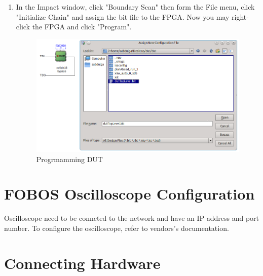 \begin{enumerate}
\begin{figure}[H]
\begin{center}
		\caption{\label{fig:dut-run-impact}}
		\end{center}
		\vspace{-3ex}
		\end{figure}
  \item In the Impact window, click "Boundary Scan" then form the File menu, click "Initialize Chain" and assign the bit file to the FPGA. Now you may right-click the FPGA and click "Program".
		\begin{figure}[H]
		\begin{center}
		\includegraphics[scale=0.6]{figures/dut-program}
		\caption{\label{fig:dut-program}Progrmamming DUT}
		\end{center}
		\vspace{-3ex}
		\end{figure}
  \end{enumerate}


\section{FOBOS Oscilloscope Configuration}
Oscilloscope need to be conncted to the network and have an IP address and port number. To configure the oscilloscope, refer to vendors's documentation.

\section{Connecting Hardware}


